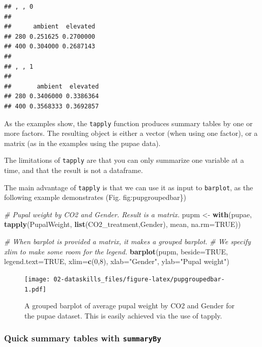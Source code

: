 \documentclass[]{book}
\newenvironment{Shaded}{\begin{snugshade}}{\end{snugshade}}
\newcommand{\CommentTok}[1]{\textcolor[rgb]{0.56,0.35,0.01}{\textit{#1}}}
\newcommand{\DataTypeTok}[1]{\textcolor[rgb]{0.13,0.29,0.53}{#1}}
\newcommand{\DecValTok}[1]{\textcolor[rgb]{0.00,0.00,0.81}{#1}}
\newcommand{\KeywordTok}[1]{\textcolor[rgb]{0.13,0.29,0.53}{\textbf{#1}}}
\newcommand{\NormalTok}[1]{#1}
\newcommand{\OtherTok}[1]{\textcolor[rgb]{0.56,0.35,0.01}{#1}}
\newcommand{\StringTok}[1]{\textcolor[rgb]{0.31,0.60,0.02}{#1}}
\begin{document}
\begin{verbatim}
## , , 0
## 
##      ambient  elevated
## 280 0.251625 0.2700000
## 400 0.304000 0.2687143
## 
## , , 1
## 
##       ambient  elevated
## 280 0.3406000 0.3386364
## 400 0.3568333 0.3692857
\end{verbatim}

As the examples show, the \texttt{tapply} function produces summary tables by one or more factors. The resulting object is either a vector (when using one factor), or a matrix (as in the examples using the pupae data).

The limitations of \texttt{tapply} are that you can only summarize one variable at a time, and that the result is not a dataframe.

The main advantage of \texttt{tapply} is that we can use it as input to \texttt{barplot}, as the following example demonstrates (Fig. fig:pupgroupedbar\})

\begin{Shaded}
\begin{Highlighting}[]
\CommentTok{# Pupal weight by CO2 and Gender. Result is a matrix.}
\NormalTok{pupm <-}\StringTok{ }\KeywordTok{with}\NormalTok{(pupae, }\KeywordTok{tapply}\NormalTok{(PupalWeight, }\KeywordTok{list}\NormalTok{(CO2_treatment,Gender), }
\NormalTok{                           mean, }\DataTypeTok{na.rm=}\OtherTok{TRUE}\NormalTok{))}

\CommentTok{# When barplot is provided a matrix, it makes a grouped barplot.}
\CommentTok{# We specify xlim to make some room for the legend.}
\KeywordTok{barplot}\NormalTok{(pupm, }\DataTypeTok{beside=}\OtherTok{TRUE}\NormalTok{, }\DataTypeTok{legend.text=}\OtherTok{TRUE}\NormalTok{, }\DataTypeTok{xlim=}\KeywordTok{c}\NormalTok{(}\DecValTok{0}\NormalTok{,}\DecValTok{8}\NormalTok{),}
        \DataTypeTok{xlab=}\StringTok{"Gender"}\NormalTok{, }\DataTypeTok{ylab=}\StringTok{"Pupal weight"}\NormalTok{)}
\end{Highlighting}
\end{Shaded}

\begin{figure}
\centering
\texttt{[image: 02-dataskills\_files/figure-latex/pupgroupedbar-1.pdf]}
\caption{\label{fig:pupgroupedbar}A grouped barplot of average pupal weight by CO2 and Gender for the pupae dataset. This is easily achieved via the use of tapply.}
\end{figure}

\hypertarget{summaryby}{%
\subsubsection{\texorpdfstring{Quick summary tables with \texttt{summaryBy}}{Quick summary tables with summaryBy}}\label{summaryby}}
\end{document}

